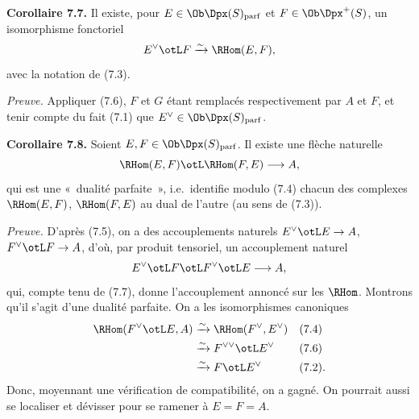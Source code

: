 \textbf{Corollaire 7.7.} Il existe, pour \(E\in\Ob\Dpx(S)_{\mathrm{parf}}\) et \(F\in\Ob\Dpx^+(S)\), un isomorphisme fonctoriel
\[
  E^\vee\otL F\xrightarrow{\sim}\RHom(E,F),
\]
avec la notation de (7.3).

\emph{Preuve.} Appliquer (7.6), \(F\) et \(G\) étant remplacés respectivement par \(A\) et \(F\), et tenir compte du fait (7.1) que \(E^\vee\in\Ob\Dpx(S)_{\mathrm{parf}}\).

\textbf{Corollaire 7.8.} Soient \(E,F\in\Ob\Dpx(S)_{\mathrm{parf}}\). Il existe une flèche naturelle
\[
  \RHom(E,F)\otL\RHom(F,E)\longrightarrow A,
\]
qui est une «~dualité parfaite~», i.e.\ identifie modulo (7.4) chacun des complexes \(\RHom(E,F)\), \(\RHom(F,E)\) au dual de l'autre (au sens de (7.3)).

\emph{Preuve.} D'après (7.5), on a des accouplements naturels \(E^\vee\otL E\to A\), \(F^\vee\otL F\to A\), d'où, par produit tensoriel, un accouplement naturel
\[
  E^\vee\otL F\otL F^\vee\otL E\longrightarrow A,
\]
qui, compte tenu de (7.7), donne l'accouplement annoncé sur les \(\RHom\). Montrons qu'il s'agit d'une dualité parfaite. On a les isomorphismes canoniques
\[
\begin{aligned}
\RHom(F^\vee\otL E,A)&\xrightarrow{\sim}\RHom(F^\vee,E^\vee) &&(7.4)\\
&\xrightarrow{\sim}F^{\vee\vee}\otL E^\vee &&(7.6)\\
&\xrightarrow{\sim}F\otL E^\vee &&(7.2).
\end{aligned}
\]
Donc, moyennant une vérification de compatibilité, on a gagné. On pourrait aussi se localiser et dévisser pour se ramener à \(E=F=A\).


